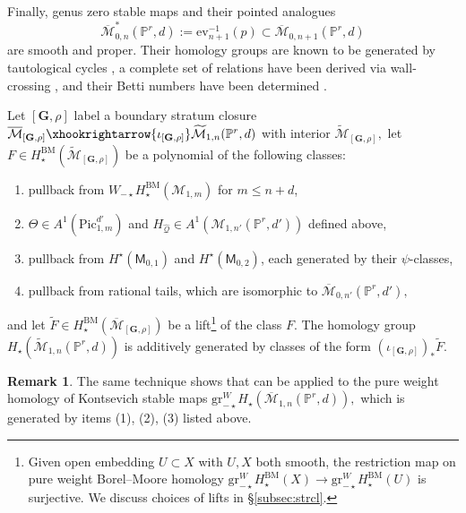 \documentclass[12pt,reqno]{amsart}
\theoremstyle{definition}
\newenvironment{customthm}[1]
  {\renewcommand\theinnercustomthm{#1}\innercustomthm}
  {\endinnercustomthm}
\theoremstyle{definition}
\theoremstyle{definition}
\theoremstyle{definition}
\newtheorem{remark}[theorem]{Remark}
\newcommand{\ol}[1]{\overline{#1}}
\newcommand{\PP}{\mathbb{P}}
\newcommand{\Mcal}{\mathcal{M}}
\newcommand{\Mbar}{\ol{\Mcal}}
\newcommand{\Mtil}{\widetilde{\mathcal{M}}}
\begin{document}
Finally, genus zero stable maps and their pointed analogues $$\Mbar_{0,n}^*(\PP^r,d):=\mathrm{ev}_{n+1}^{-1}(p)\subset \Mbar_{0,n+1}(\PP^r,d)$$ are smooth and proper. Their homology groups are known to be generated by tautological cycles \cite{opretorus}, a complete set of relations have been derived via wall-crossing \cite{mmchow,mminter,mmtaut}, and their Betti numbers have been determined \cite{getzpand}.

\begin{customthm}{A}[Corollary \ref{cor:maingen}]\label{thm:maingen}
  Let $[\mathbf{G},\rho]$ label a boundary stratum closure $\Mbar_{[\mathbf{G},\rho]}\xhookrightarrow{\iota_{[\mathbf{G},\rho]}} \Mtil_{1,n}(\mathbb{P}^r,d)$ with interior $\Mtil_{[\mathbf{G},\rho]},$ let $F\in H_{\star}^{\mathrm{BM}}(\Mtil_{[\mathbf{G},\rho]})$ be a polynomial of the following classes:
  \begin{enumerate}
    \item pullback from \(W_{-\star} H_{\star}^{\mathrm{BM}}(\mathcal{M}_{1,m})\) for \(m\leq n+d\),
    \item $\Theta\in A^1(\mathrm{Pic}^{d'}_{1,m})$ and $H_{\hat{\mathcal{Q}}}\in A^1(\mathcal{M}_{1,n'}(\mathbb{P}^r,d'))$ defined above,
    \item pullback from $H^\star(\mathsf{M}_{0,1})$ and $H^\star(\mathsf{M}_{0,2})$, each generated by their $\psi$-classes,
    \item pullback from rational tails, which are isomorphic to $\Mbar_{0,n'}(\mathbb{P}^r,d'),$
  \end{enumerate}
  and let $\tilde{F}\in H_{\star}^{\mathrm{BM}}(\Mbar_{[\mathbf{G},\rho]})$ be a lift\footnote{Given open embedding $U\subset X$ with $U, X$ both smooth, the restriction map on pure weight Borel--Moore homology $\mathrm{gr}^W_{-\star} H^{\mathrm{BM}}_\star(X)\to \mathrm{gr}^W_{-\star} H^{\mathrm{BM}}_\star(U)$ is surjective. We discuss choices of lifts in §\ref{subsec:strcl}.} of the class $F.$ The homology group $H_\star(\Mtil_{1,n}(\mathbb{P}^r,d))$ is additively generated by classes of the form $(\iota_{[\mathbf{G},\rho]})_* \tilde{F}.$ 
\end{customthm}

\begin{remark}
  The same technique shows that   can be applied to the pure weight homology of Kontsevich stable maps $\mathrm{gr}^W_{-\star} H_\star(\Mbar_{1,n}(\PP^r,d)),$ which is generated by items (1), (2), (3) listed above.
\end{remark}
\end{document}
